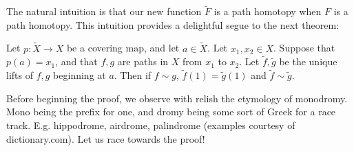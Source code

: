   The natural intuition is that our new function $\tilde{F}$ is a path homotopy when $F$ is a path homotopy. This intuition provides a delightful segue to the next theorem:
  \begin{theorem}
  Let $p: \tilde{X}\to X$ be a covering map, and let $a\in \tilde{X}$. Let $x_1,x_2\in X$. Suppose that $p(a)=x_1$, and that $f,g$ are paths in $X$ from $x_1$ to $x_2$. Let $\tilde{f}, \tilde{g}$ be the unique lifts of $f,g$ beginning at $a$. Then if $f\sim g$, $\tilde{f}(1)=\tilde{g}(1)$ and $\tilde{f}\sim \tilde{g}$.
  \end{theorem}
   Before beginning the proof, we observe with relish the etymology of monodromy. Mono being the prefix for one, and dromy being some sort of Greek for a race track. E.g. hippodrome, airdrome, palindrome (examples courtesy of dictionary.com). Let us race towards the proof!
